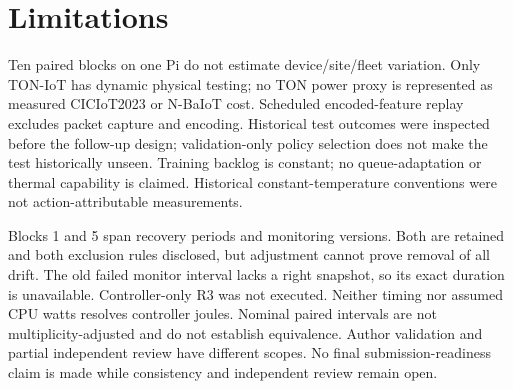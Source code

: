 \section{Limitations}\label{sec:limits}
Ten paired blocks on one Pi do not estimate device/site/fleet variation. Only TON-IoT has dynamic physical testing; no TON power proxy is represented as measured CICIoT2023 or N-BaIoT cost. Scheduled encoded-feature replay excludes packet capture and encoding. Historical test outcomes were inspected before the follow-up design; validation-only policy selection does not make the test historically unseen. Training backlog is constant; no queue-adaptation or thermal capability is claimed. Historical constant-temperature conventions were not action-attributable measurements.

Blocks 1 and 5 span recovery periods and monitoring versions. Both are retained and both exclusion rules disclosed, but adjustment cannot prove removal of all drift. The old failed monitor interval lacks a right snapshot, so its exact duration is unavailable. Controller-only R3 was not executed. Neither timing nor assumed CPU watts resolves controller joules. Nominal paired intervals are not multiplicity-adjusted and do not establish equivalence. Author validation and partial independent review have different scopes. No final submission-readiness claim is made while consistency and independent review remain open.
